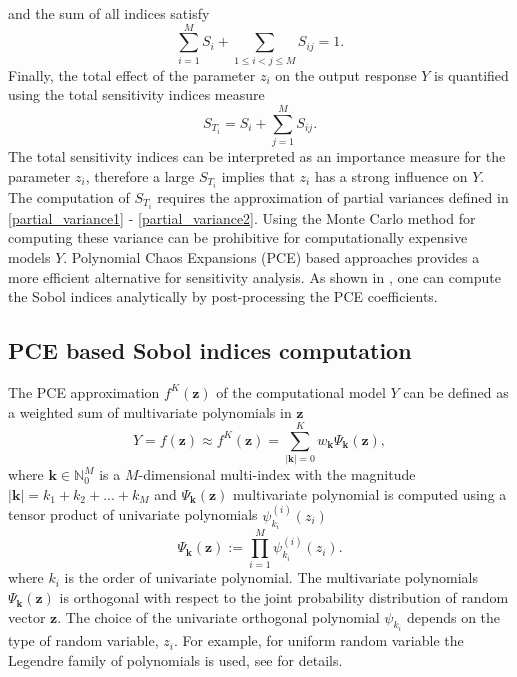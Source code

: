 \documentclass[review]{elsarticle}
\numberwithin{equation}{section}
\numberwithin{equation}{section}
\begin{document}
and the sum of all indices satisfy
\begin{equation}
\sum_{i=1}^M S_i + \sum_{1\leq i<j\leq M} S_{ij} = 1.
\end{equation}
Finally, the total effect of the parameter $z_i$ on the output response $Y$ is quantified using the total sensitivity indices measure
\begin{equation}
S_{T_i} = S_i + \sum_{j=1}^M S_{ij}.
\end{equation}
The total sensitivity indices can be interpreted as an importance measure for the parameter $z_i$, therefore a large $S_{T_i}$ implies that $z_i$ has a strong influence on $Y$. The computation of $S_{T_i}$ requires the approximation of partial variances defined in \eqref{partial_variance1} - \eqref{partial_variance2}. Using the Monte Carlo method for computing these variance can be prohibitive for computationally expensive models $Y$. Polynomial Chaos Expansions (PCE) based approaches provides a more efficient alternative for sensitivity analysis. As shown in \cite{SUDRET2008964}, one can compute the Sobol indices analytically by post-processing the PCE coefficients.
\subsection{PCE based Sobol indices computation}
The PCE approximation $f^{K}(\mathbf{z})$ of the computational model $Y$ can be defined as a weighted sum of multivariate polynomials in $\mathbf{z}$ \cite{RSmith}
\begin{equation}\label{eq:PCE}
Y= f(\mathbf{z}) \approx f^{K}(\mathbf{z}) = \sum_{|\mathbf{k}| = 0}^K w_{\mathbf{k}}\Psi_{\mathbf{k}}(\mathbf{z}),
\end{equation}
where $\mathbf{k}\in \mathbb{N}_0^M$ is a $M$-dimensional multi-index with the magnitude $|\mathbf{k}| = k_1+k_2 + ... + k_M$ and $\Psi_{\mathbf{k}}(\mathbf{z})$ multivariate polynomial is computed using a tensor product of univariate polynomials $\psi_{k_i}^{(i)}(z_i)$
\begin{equation}
\Psi_{\mathbf{k}}(\mathbf{z}) := \prod_{i=1}^M\psi_{k_i}^{(i)}(z_i).
\end{equation}
where $k_i$ is the order of univariate polynomial. The multivariate polynomials $\Psi_{\mathbf{k}}(\mathbf{z})$ is orthogonal with respect to the joint probability distribution of random vector $\mathbf{z}$. The choice of the univariate orthogonal polynomial $\psi_{k_i}$ depends on the type of random variable, $z_i$. For example, for uniform random variable the Legendre family of polynomials is used, see \cite{Xiu2002} for details. 
\end{document}
